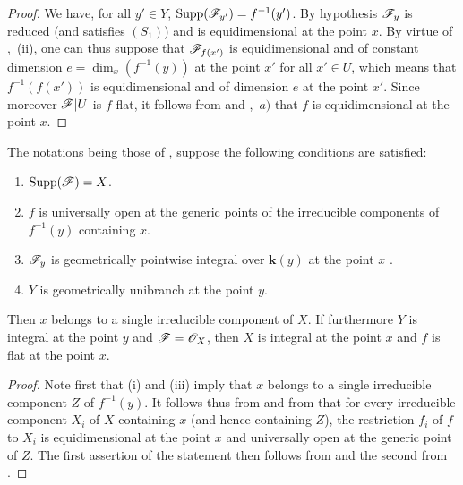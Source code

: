 \begin{proof}
\label{IV.15.3.2-proof}
We have, for all $y'\in Y$, $\operatorname{Supp}(\mathscr{F}_{y'})=f^{-1}(y')$.
By hypothesis $\mathscr{F}_y$ is reduced (and satisfies $(S_1)$) and is equidimensional at the point $x$.
By virtue of ,~(ii), one can thus suppose that $\mathscr{F}_{f(x')}$ is equidimensional and of constant dimension $e=\dim_x(f^{-1}(y))$ at the point $x'$ for all $x'\in U$, which means that $f^{-1}(f(x'))$ is equidimensional and of dimension $e$ at the point $x'$.
Since moreover $\mathscr{F}|U$ is $f$-flat, it follows from  and ,~$a)$ that $f$ is equidimensional at the point $x$.
\end{proof}

\begin{corollary}[15.3.3]
\label{IV.15.3.3}
The notations being those of , suppose the following conditions are satisfied:
\begin{enumerate}[label=\textup{(\roman*)}]
  \item $\operatorname{Supp}(\mathscr{F})=X$.
  \item $f$ is universally open at the generic points of the irreducible components of $f^{-1}(y)$ containing $x$.
  \item $\mathscr{F}_y$ is geometrically pointwise integral over $\boldsymbol{k}(y)$ at the point $x$ .
  \item $Y$ is geometrically unibranch at the point $y$.
\end{enumerate}
Then $x$ belongs to a single irreducible component of $X$.
If furthermore $Y$ is integral at the point $y$ and $\mathscr{F}=\mathscr{O}_X$, then $X$ is integral at the point $x$ and $f$ is flat at the point $x$.
\end{corollary}

\begin{proof}
\label{IV.15.3.3-proof}
Note first that (i) and (iii) imply that $x$ belongs to a single irreducible component $Z$ of $f^{-1}(y)$.
It follows thus from  and from  that for every irreducible component $X_i$ of $X$ containing $x$ (and hence containing $Z$), the restriction $f_i$ of $f$ to $X_i$ is equidimensional at the point $x$ and universally open at the generic point of $Z$.
The first assertion of the statement then follows from  and the second from .
\end{proof}


